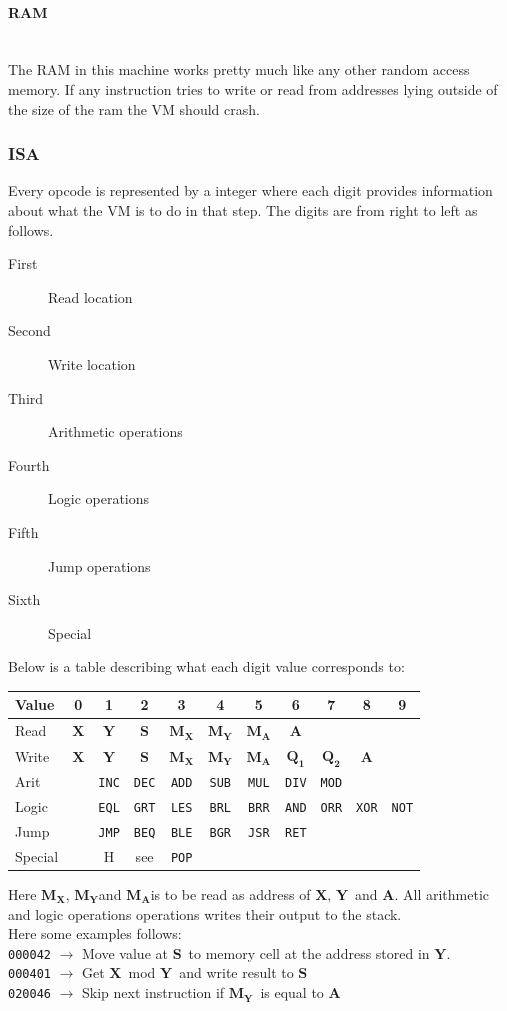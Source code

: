 \documentclass{article}
\newcommand{\V}{\verb}
\newcommand{\x}{$\textbf{X}$}
\newcommand{\y}{$\textbf{Y}$}
\newcommand{\s}{$\textbf{S}$}
\newcommand{\A}{$\textbf{A}$}
\newcommand{\mx}{$\textbf{M}_{\textbf{X}}$}
\newcommand{\my}{$\textbf{M}_{\textbf{Y}}$}
\newcommand{\ma}{$\textbf{M}_{\textbf{A}}$}
\newcommand{\q}{$\textbf{Q}_{\textbf{1}}$}
\newcommand{\qq}{$\textbf{Q}_{\textbf{2}}$}
\begin{document}
\paragraph{RAM} \
\\
The RAM in this machine works pretty much like any other random access
memory. If any instruction tries to write or read from addresses lying outside
of the size of the ram the VM should crash.

\subsubsection{ISA}
Every opcode is represented by a integer where each digit provides
information about what the VM is to do in that step. The digits are from right
to left as follows.

\begin{description}
  \item[First] Read location
  \item[Second] Write location
  \item[Third] Arithmetic operations
  \item[Fourth] Logic operations
  \item[Fifth] Jump operations
  \item[Sixth] Special
\end{description}
Below is a table describing what each digit value corresponds to:
\begin{center}
\begin{tabular}{l || *{10}{c |}}
Value & 0 & 1 & 2 & 3 & 4 & 5 & 6 & 7 & 8 & 9 \\
\hline
Read & \x & \y & \s  &\mx & \my & \ma & \A & & & \\

Write & \x & \y & \s  &\mx & \my & \ma & \q& \qq & \A &\\

Arit &  & \V+INC+ & \V+DEC+ & \V+ADD+ & \V+SUB+ & \V+MUL+ & \V+DIV+ & \V+MOD+  &
&
\\

Logic &  &  \V+EQL+ & \V+GRT+ & \V+LES+ & \V+BRL+ & \V+BRR+ & \V+AND+ & \V+ORR+
& \V+XOR+ & \V+NOT+\\

Jump & & \V+JMP+ & \V+BEQ+ & \V+BLE+ & \V+BGR+ & \V+JSR+ & \V+RET+ & & & \\

Special & & H & see & \V+POP+ &  &  &  &  &  &  \\
\end{tabular}
\end{center}
Here \mx , \my and \ma is to be read as address of \x , \y \ and \A.  All
arithmetic and logic operations operations writes their output to the stack.\\
Here some examples follows:\\
\verb+000042+ $\rightarrow$ Move value at \s \ to memory cell at the address
stored in \y. \\
\verb+000401+ $\rightarrow$ Get \x \ mod \y \ and write result to \s \\
\verb+020046+ $\rightarrow$ Skip next instruction if \my \ is equal to \A \\
\newpage
\end{document}
